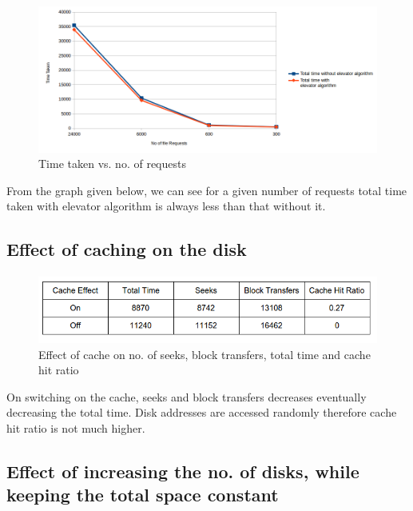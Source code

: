 \documentclass[11pt]{article}
\begin{document}
\begin{figure}[ht!]
\center
\includegraphics[scale = 0.63]{images/img1.png} 
\caption{Time taken vs. no. of requests}
\label{overflow}
\end{figure}

From the graph given below, we can see for a given number of requests total time taken with elevator algorithm is always less than that without it. 

\subsection{Effect of caching on the disk}
\paragraph{}

\begin{figure}[ht!]
\center
\includegraphics[scale = 0.70]{images/table2.png}
\caption{Effect of cache on no. of seeks, block transfers, total time and cache hit ratio}
\label{overflow}
\end{figure}



On switching on the cache, seeks and block transfers decreases eventually decreasing the total time. Disk addresses are accessed randomly therefore cache hit ratio is not much higher. 


\subsection{Effect of increasing the no. of disks, while keeping the total space constant}
\paragraph{}
\end{document}
